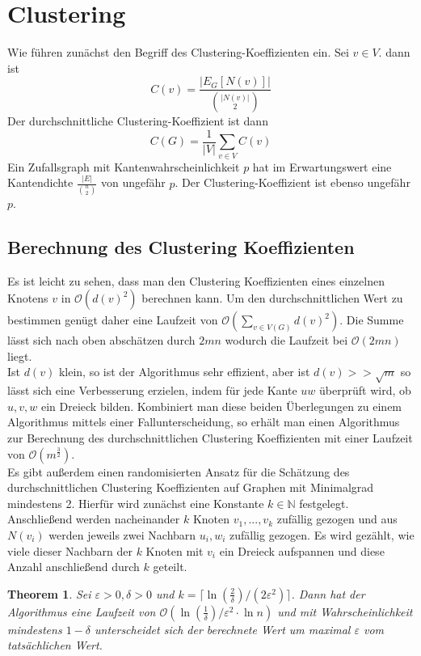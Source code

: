 \documentclass[a4paper, 12pt]{article}
\theoremstyle{plain}
\newtheorem{theorem}{Theorem}[subsection] %
\theoremstyle{definition}
\theoremstyle{lemma}
\theoremstyle{remark}
\theoremstyle{corollary}
\theoremstyle{example}
\begin{document}
	\section{Clustering}
	Wie führen zunächst den Begriff des Clustering-Koeffizienten ein. Sei $v \in V$. dann ist \[C(v) = \frac{\left|E_G[N(v)]\right|}{\binom{\left|N(v)\right|}{2}}\] Der durchschnittliche Clustering-Koeffizient ist dann \[C(G) = \frac{1}{\left|V\right|} \sum_{v \in V} C(v)\] Ein Zufallsgraph mit Kantenwahrscheinlichkeit $p$ hat im Erwartungswert eine Kantendichte $\frac{\left|E\right|}{\binom{n}{2}}$ von ungefähr $p$. Der Clustering-Koeffizient ist ebenso ungefähr $p$.
	\subsection{Berechnung des Clustering Koeffizienten}
	Es ist leicht zu sehen, dass man den Clustering Koeffizienten eines einzelnen Knotens $v$ in $\mathcal{O}(d(v)^2)$ berechnen kann. Um den durchschnittlichen Wert zu bestimmen genügt daher eine Laufzeit von $\mathcal{O}(\sum_{v \in V(G)} d(v)^2)$. Die Summe lässt sich nach oben abschätzen durch $2mn$ wodurch die Laufzeit bei $\mathcal{O}(2mn)$ liegt.\\
	Ist $d(v)$ klein, so ist der Algorithmus sehr effizient, aber ist $d(v) >> \sqrt{m}$ so lässt sich eine Verbesserung erzielen, indem für jede Kante $uw$ überprüft wird, ob $u,v,w$ ein Dreieck bilden. Kombiniert man diese beiden Überlegungen zu einem Algorithmus mittels einer Fallunterscheidung, so erhält man einen Algorithmus zur Berechnung des durchschnittlichen Clustering Koeffizienten mit einer Laufzeit von $\mathcal{O}(m^\frac{3}{2})$.\\
	Es gibt außerdem einen randomisierten Ansatz für die Schätzung des durchschnittlichen Clustering Koeffizienten auf Graphen mit Minimalgrad mindestens 2. Hierfür wird zunächst eine Konstante $k\in\mathbb{N}$ festgelegt. Anschließend werden nacheinander $k$ Knoten $v_1,...,v_k$ zufällig gezogen und aus $N(v_i)$ werden jeweils zwei Nachbarn $u_i,w_i$ zufällig gezogen. Es wird gezählt, wie viele dieser Nachbarn der $k$ Knoten mit $v_i$ ein Dreieck aufspannen und diese Anzahl anschließend durch $k$ geteilt.
	\begin{theorem}
		Sei $\varepsilon>0, \delta>0$ und $k=\lceil\ln\left(\frac{2}{\delta}\right)/(2\varepsilon^2)\rceil$. Dann hat der Algorithmus eine Laufzeit von $\mathcal{O}(\ln\left(\frac{1}{\delta}\right)/\varepsilon^2\cdot \ln n)$ und mit Wahrscheinlichkeit mindestens $1-\delta$ unterscheidet sich der berechnete Wert um maximal $\varepsilon$ vom tatsächlichen Wert.
	\end{theorem}
\end{document}
